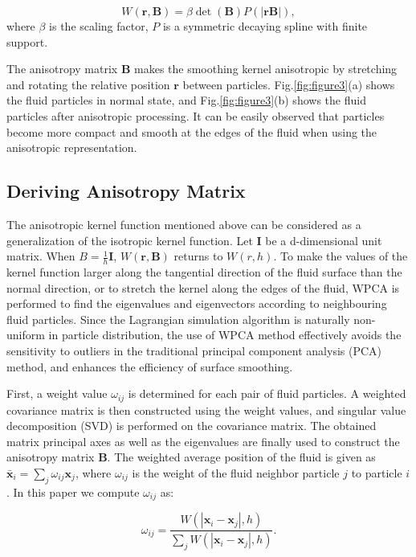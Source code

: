 \documentclass[times,twocolumn,final]{elsarticle}
\begin{document}
\begin{equation}
W(\mathbf{r},\mathbf{B})=\beta \operatorname{det}(\mathbf{B}) P(|\mathbf{r}\mathbf{B}|),
\label{con:equa10}
\end{equation}
where $\beta$ is the scaling factor, $P$ is a symmetric decaying spline with finite support.

The anisotropy matrix $\mathbf{B}$ makes the smoothing kernel anisotropic by stretching and rotating the relative position $\mathbf{r}$ between particles. Fig.\ref{fig:figure3}(a) shows the fluid particles in normal state, and Fig.\ref{fig:figure3}(b) shows the fluid particles after anisotropic processing. It can be easily observed that particles become more compact and smooth at the edges of the fluid when using the anisotropic representation.

\subsection{Deriving Anisotropy Matrix}
The anisotropic kernel function mentioned above can be considered as a generalization of the isotropic kernel function. Let $\mathbf{I}$ be a d-dimensional unit matrix. When $B=\frac 1 h \mathbf{I}$, $W(\mathbf{r},\mathbf{B})$ returns to $W(r,h)$. To make the values of the kernel function larger along the tangential direction of the fluid surface than the normal direction, or to stretch the kernel along the edges of the fluid, WPCA\cite{ref:ref30} is performed to find the eigenvalues and eigenvectors according to neighbouring fluid particles. Since the Lagrangian simulation algorithm is naturally non-uniform in particle distribution, the use of WPCA method effectively avoids the sensitivity to outliers in the traditional principal component analysis (PCA) method, and enhances the efficiency of surface smoothing.

First, a weight value $\omega_{ij}$ is determined for each pair of fluid particles. A weighted covariance matrix is then constructed using the weight values, and singular value decomposition (SVD) is performed on the covariance matrix. The obtained matrix principal axes as well as the eigenvalues are finally used to construct the anisotropy matrix $\mathbf{B}$. The weighted average position of the fluid is given as $\bar{\mathbf{x}}_{i}=\sum_{j} \omega_{ij} \mathbf{x}_{j}$, where $\omega_{ij}$ is the weight of the fluid neighbor particle $j$ to particle $i$. In this paper we 
compute $\omega_{i j}$ as:

\begin{equation}
\omega_{i j}=\frac{W\left(\left|\mathbf{x}_{i}-\mathbf{x}_{j}\right|, h\right)}{\sum_{j} W\left(\left|\mathbf{x}_{i}-\mathbf{x}_{j}\right|, h\right)}.\label{con:equa11}
\end{equation}
\end{document}
